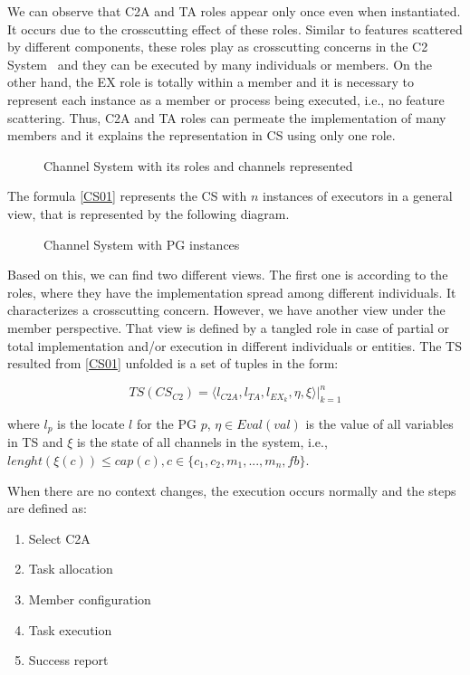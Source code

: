 We can observe that C2A and TA roles appear only once even when instantiated. It occurs due to the crosscutting effect of these roles. Similar to features scattered by different components, these roles play as crosscutting concerns in the C2 System~\cite{Apel2013} and they can be executed by many individuals or members. On the other hand, the EX role is totally within a member and it is necessary to represent each instance as a member or process being executed, i.e., no feature scattering. Thus, C2A and TA roles can permeate the implementation of many members and it explains the representation in CS using only one role. 

\begin{figure}[h]
\centering
\label{cs01}
\scalebox{1}{}
\caption{Channel System with its roles and channels represented}
\end{figure}

The formula \ref{CS01} represents the CS with $n$ instances of executors in a general view, that is represented by the following diagram.

\begin{figure}[h]
\centering
\label{cs02}
\scalebox{1}{}
\caption{Channel System with PG instances}
\end{figure}

Based on this, we can find two different views. The first one is according to the roles, where they have the implementation spread among different individuals. It characterizes a crosscutting concern. However, we have another view under the member perspective. That view is defined by a tangled role in case of partial or total implementation and/or execution in different individuals or entities. 
The TS resulted from \ref{CS01} unfolded is a set of tuples in the form:

\begin{equation}
\label{CS02}
    TS(CS_{C2})=\langle l_{C2A}, l_{TA}, l_{EX_k}, \eta, \xi \rangle |_{k=1}^n
\end{equation}

where $l_p$ is the locate $l$ for the PG $p$, $\eta \in Eval(val)$ is the value of all variables in TS and $\xi$ is the state of all channels in the system, i.e., $lenght(\xi(c)) \leq cap(c), c \in \{c_1, c_2, m_1, ..., m_n, fb\}$.


When there are no context changes, the execution occurs normally and the steps are defined as:

\begin{enumerate}
    \item Select C2A
    \item Task allocation
    \item Member configuration
    \item Task execution
    \item Success report
\end{enumerate}

